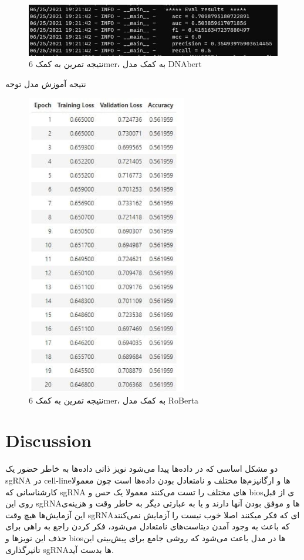 \documentclass[12pt,a4paper,BCOR=.7cm,headsepline,bibliography=totoc]{report}
\begin{document}
\begin{figure}[H]
\centering
\includegraphics[width=15cm, ]{pictures/6mer.jpg}
\caption{
نتیجه تمرین به کمک 6mer، به کمک مدل DNAbert
}\label{wrap-fig:4}
\end{figure}
نتیجه آموزش مدل توجه
\begin{figure}[H]
\centering
\includegraphics[width=7cm, ]{pictures/crisprBert.jpg}
\caption{
نتیجه تمرین به کمک 6mer، به کمک مدل RoBerta
}\label{wrap-fig:4}
\end{figure}

\chapter{Discussion}
دو مشکل اساسی که در داده‌ها پیدا می‌شود نویز ذاتی داده‌ها به خاطر حضور یک sgRNA در cell-lineها و ارگانیزم‌ها مختلف و نامتعادل بودن داده‌ها است چون معمولا کارشناسانی که sgRNA های مختلف را تست می‌کنند معمولا یک حس و biosی از قبل روی این sgRNAها و موفق بودن آنها دارند و یا به عبارتی دیگر به خاطر وقت و هزینه‌ی این آزمایش‌ها هیچ وقت sgRNAای که فکر میکنند اصلا خوب نیست را آزمایش نمی‌کنند که باعث به وجود آمدن دیتاست‌های نامتعادل می‌شود، فکر کردن راجع به راهی برای حذف این نویز‌ها و bios‌ها در مدل باعث می‌شود که روشی جامع برای پیش‌بینی این تاثیرگذاری sgRNAها بدست آید. 
\end{document}
